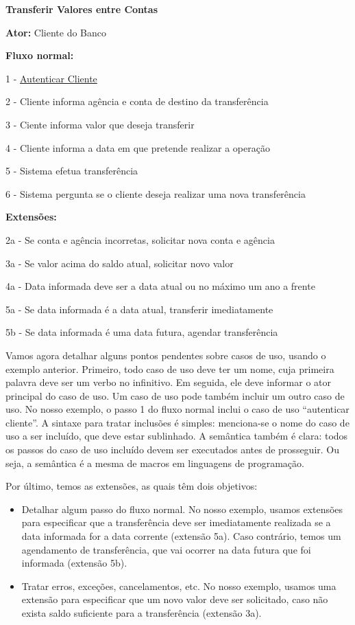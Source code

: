 \documentclass[
  11pt,
  twoside]{book}
\renewenvironment{quote}{\centering \vspace{1.5ex} \begin{tcolorbox}[colback=backcolor, width=4.9in]}{\end{tcolorbox}}
\begin{document}
\begin{quote}
\textbf{Transferir Valores entre Contas}

\textbf{Ator:} Cliente do Banco

\textbf{Fluxo normal:}

1 - \underline{Autenticar Cliente}

2 - Cliente informa agência e conta de destino da transferência

3 - Ciente informa valor que deseja transferir

4 - Cliente informa a data em que pretende realizar a operação

5 - Sistema efetua transferência

6 - Sistema pergunta se o cliente deseja realizar uma nova transferência

\textbf{Extensões:}

2a - Se conta e agência incorretas, solicitar nova conta e agência

3a - Se valor acima do saldo atual, solicitar novo valor

4a - Data informada deve ser a data atual ou no máximo um ano a frente

5a - Se data informada é a data atual, transferir imediatamente

5b - Se data informada é uma data futura, agendar transferência
\end{quote}

Vamos agora detalhar alguns pontos pendentes sobre casos de uso, usando
o exemplo anterior. Primeiro, todo caso de uso deve ter um nome, cuja
primeira palavra deve ser um verbo no infinitivo. Em seguida, ele deve
informar o ator principal do caso de uso. Um caso de uso pode também
incluir um outro caso de uso. No nosso exemplo, o passo 1 do fluxo
normal inclui o caso de uso ``autenticar cliente''. A sintaxe para
tratar inclusões é simples: menciona-se o nome do caso de uso a ser
incluído, que deve estar sublinhado. A semântica também é clara: todos
os passos do caso de uso incluído devem ser executados antes de
prosseguir. Ou seja, a semântica é a mesma de macros em linguagens de
programação.

Por último, temos as extensões, as quais têm dois objetivos:

\begin{itemize}
\item
  Detalhar algum passo do fluxo normal. No nosso exemplo, usamos
  extensões para especificar que a transferência deve ser imediatamente
  realizada se a data informada for a data corrente (extensão 5a). Caso
  contrário, temos um agendamento de transferência, que vai ocorrer na
  data futura que foi informada (extensão 5b).
\item
  Tratar erros, exceções, cancelamentos, etc. No nosso exemplo, usamos
  uma extensão para especificar que um novo valor deve ser solicitado,
  caso não exista saldo suficiente para a transferência (extensão 3a).
\end{itemize}
\end{document}
